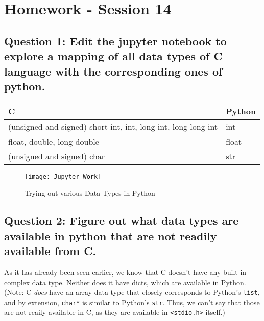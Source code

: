 \documentclass[12pt,a4paper]{article}
\begin{document}
\pagebreak
\section{Homework - Session 14}

\subsection{Question 1: Edit the jupyter notebook to explore a mapping of all data types of C language with the corresponding ones of python.}

\begin{tabular}{|l|l|}
	\hline	
	C & Python\\
	\hline
	(unsigned and signed) short int, int, long int, long long int & int\\
	float, double, long double & float\\
	(unsigned and signed) char & str\\
	\hline
\end{tabular}

\begin{figure}[h]
	\texttt{[image: Jupyter\_Work]}
	\caption{Trying out various Data Types in Python}
\end{figure}

\subsection{Question 2: Figure out what data types are available in python that are not readily available from C.}

As it has already been seen earlier, we know that C doesn't have any built in complex data type. Neither does it have dicts, which are available in Python. (Note: C \textit{does} have an array data type that closely corresponds to Python's \lstinline{list}, and by extension, \lstinline{char*} is similar to Python's \lstinline{str}. Thus, we can't say that those are not reaily available in C, as they are available in \lstinline{<stdio.h>} itself.)
\end{document}
